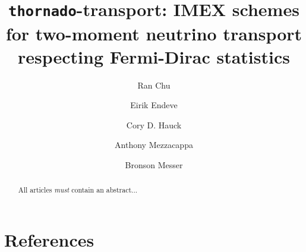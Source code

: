 \documentclass[a4paper]{jpconf}
\begin{document}
\title{\texttt{thornado}-transport: IMEX schemes for two-moment neutrino transport respecting Fermi-Dirac statistics}

\author{Ran Chu}
\address{Department of Physics and Astronomy, University of Tennessee Knoxville, TN 37996-1200}

\author{Eirik Endeve}
\address{Computational and Applied Mathematics Group, Oak Ridge National Laboratory, Oak Ridge, TN 37831 USA}
\address{Department of Physics and Astronomy, University of Tennessee Knoxville, TN 37996-1200}

\author{Cory D. Hauck}
\address{Computational and Applied Mathematics Group, Oak Ridge National Laboratory, Oak Ridge, TN 37831 USA}
\address{Department of Mathematics, University of Tennessee Knoxville, TN 37996-1320}

\author{Anthony Mezzacappa}
\address{Department of Physics and Astronomy, University of Tennessee Knoxville, TN 37996-1200}

\author{Bronson Messer}
\address{Scientific Computing and Theoretical Physics Groups, Oak Ridge National Laboratory, Oak Ridge, TN 37831 USA}
\address{Department of Physics and Astronomy, University of Tennessee Knoxville, TN 37996-1200}

\begin{abstract}
All articles {\it must} contain an abstract...
\end{abstract}








\section*{References}

\end{document}
